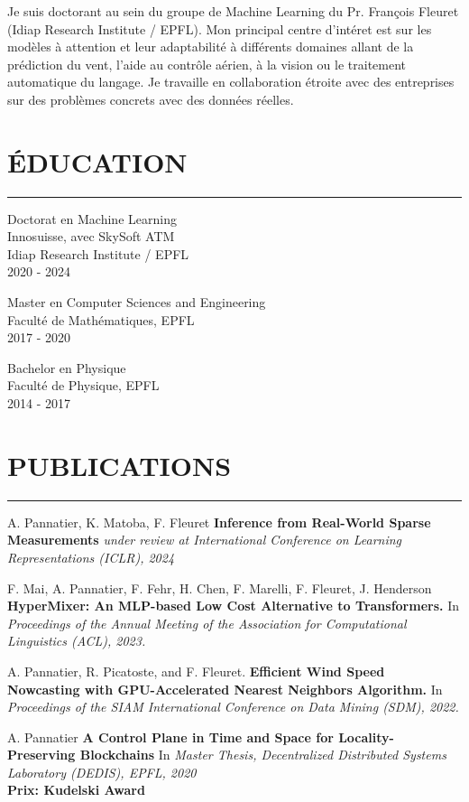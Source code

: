 \documentclass{article}
\let\oldhrule\hrule
\renewcommand{\hrule}{\color{lightgray}\oldhrule\color{black}}
\newcommand{\rubric}[1]{
    \color{mediumgray}
    \section*{\montserratlight \large \MakeUppercase{#1}} 
    \hrule
    \vspace{4mm}
    \raggedright
}
\begin{document}
\vspace{4mm}
\color{deepgray}
\small
Je suis doctorant au sein du groupe de Machine Learning du Pr. François Fleuret (Idiap Research Institute / EPFL). Mon principal centre d'intéret est sur les modèles à attention et leur adaptabilité à différents domaines allant de la prédiction du vent, l'aide au contrôle aérien, à la vision ou le traitement automatique du langage. Je travaille en collaboration étroite avec des entreprises sur des problèmes concrets avec des données réelles. \\
\begin{minipage}[t]{0.3\textwidth}
  \rubric{Éducation}

  \color{deepgray}
  \large Doctorat en Machine Learning \\
  \color{mediumgray} \small
  Innosuisse, avec SkySoft ATM \\
  Idiap Research Institute / EPFL \\
  2020 - 2024

  \vspace{4mm}
  \color{deepgray}
  \large Master en Computer Sciences and Engineering \\
  \color{mediumgray} \small
  Faculté de Mathématiques, EPFL \\
  2017 - 2020

  \vspace{4mm}
  \color{deepgray}
  \large Bachelor en Physique \\
  \color{mediumgray} \small
  Faculté de Physique, EPFL \\
  2014 - 2017

\end{minipage}\hfill
\begin{minipage}[t]{0.65\textwidth}
  \rubric{Publications}
  \small
  A. Pannatier, K. Matoba, F. Fleuret \textbf{Inference from Real-World Sparse Measurements} \textit{under review at International Conference on Learning Representations (ICLR), 2024}
  \vspace{4mm}

  F. Mai, A. Pannatier, F. Fehr, H. Chen, F. Marelli, F. Fleuret, J. Henderson \textbf{HyperMixer: An MLP-based Low Cost Alternative to Transformers.} In \textit{Proceedings of the Annual Meeting of the Association for Computational Linguistics (ACL), 2023.}
  \vspace{4mm}

  A. Pannatier, R. Picatoste, and F. Fleuret. \textbf{Efficient Wind Speed Nowcasting with GPU-Accelerated Nearest Neighbors Algorithm.} In \textit{Proceedings of the SIAM International Conference on Data Mining (SDM), 2022.}
  \vspace{4mm}

  A. Pannatier \textbf{A Control Plane in Time and Space for Locality-Preserving Blockchains} In \textit{Master Thesis, Decentralized Distributed Systems Laboratory (DEDIS), EPFL, 2020} \\
  \textbf{Prix: Kudelski Award}
  \vspace{4mm}
\end{minipage}
\end{document}
